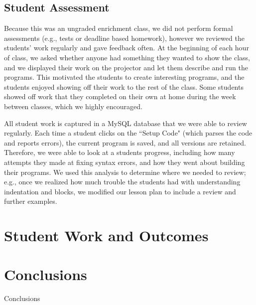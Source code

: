 \documentclass{sig-alternate}
\begin{document}
\subsection{Student Assessment}
Because this was an ungraded enrichment class, we did not perform formal assessments (e.g., tests
or deadline based homework), however we reviewed the students' work regularly and gave feedback
often.  At the beginning of each hour of class, we asked whether anyone had something they wanted
to show the class, and we displayed their work on the projector and let them describe and run the
programs.  This motivated the students to create interesting programs, and the students enjoyed
showing off their work to the rest of the class.  Some students showed off work that they completed
on their own at home during the week between classes, which we highly encouraged.

All student work is captured in a MySQL database that we were able to review regularly.  Each time
a student clicks on the ``Setup Code" (which parses the code and reports errors), the current
program is saved, and all versions are retained.  Therefore, we were able to look at a students 
progress, including how many attempts they made at fixing syntax errors, and how they went about
building their programs.  We used this analysis to determine where we needed to review; e.g.,
once we realized how much trouble the students had with understanding indentation and blocks, we
modified our lesson plan to include a review and further examples.

\section{Student Work and Outcomes}


\section{Conclusions}
Conclusions



%

%
%
\end{document}
